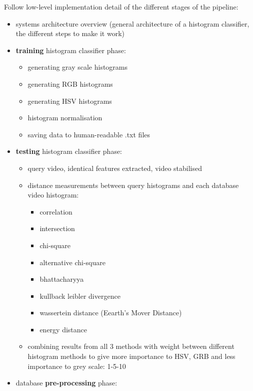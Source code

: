 Follow low-level implementation detail of the different stages of the pipeline:
\begin{itemize}
    \item systems architecture overview (general architecture of a histogram classifier, the different steps to make it work)
    \item \textbf{training} histogram classifier phase:
        \begin{itemize}
            \item generating gray scale histograms
            \item generating RGB histograms
            \item generating HSV histograms
            \item histogram normalisation
            \item saving data to human-readable .txt files
        \end{itemize}
    \item \textbf{testing} histogram classifier phase:
        \begin{itemize}
            \item query video, identical features extracted, video stabilised
            \item distance measurements between query histograms and each database video histogram:
                \begin{itemize}
                    \item correlation
                    \item intersection
                    \item chi-square
                    \item alternative chi-square
                    \item bhattacharyya
                    \item kullback leibler divergence
                    \item wassertein distance (Eearth's Mover Distance)
                    \item energy distance
                \end{itemize}
            \item combining results from all 3 methods with weight between different histogram methods to give more importance to HSV, GRB and less importance to grey scale: 1-5-10
        \end{itemize}
    \item database \textbf{pre-processing} phase:
        \begin{itemize}

\end{itemize}
\end{itemize}
